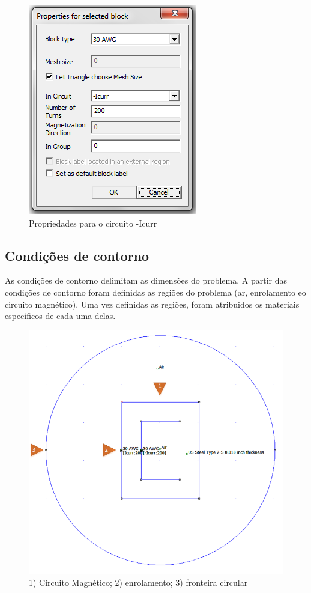 \begin{figure}[H]
\centering
\includegraphics[scale=1]{img/assig1/circ_2.png}
\caption[Propriedades para o circuito -Icurr]{Propriedades para o circuito -Icurr}
\label{icurr_m}
\end{figure}

\subsection{Condições de contorno}
As condições de contorno delimitam as dimensões do problema. A partir das condições de contorno foram definidas as regiões do problema (ar, enrolamento eo circuito magnético). Uma vez definidas as regiões, foram atribuidos os materiais específicos de cada uma delas.

\begin{figure}[H]
\centering
\includegraphics[scale=0.65]{img/assig1/circ_mag.png}
\caption[Circuito magnético, enrolamento, fronteira]{1) Circuito Magnético; 2) enrolamento; 3) fronteira circular}
\label{circ_mag}
\end{figure}
